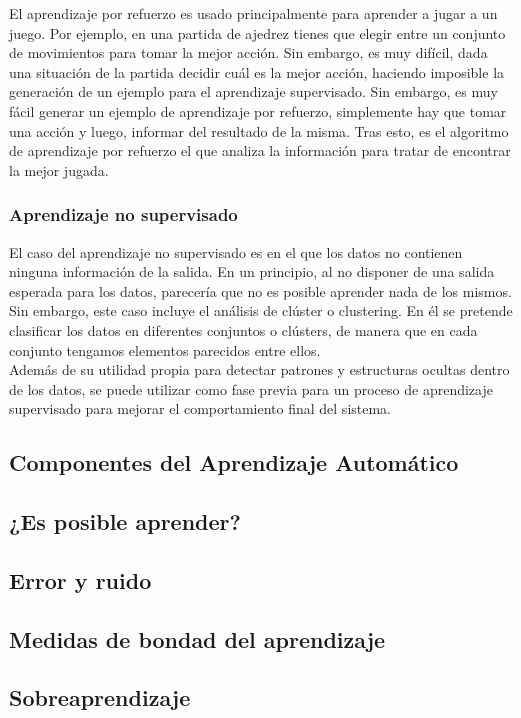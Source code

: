 El aprendizaje por refuerzo es usado principalmente para aprender a jugar a un juego. Por ejemplo, en una partida de ajedrez tienes que elegir entre un conjunto de movimientos para tomar la mejor acción. Sin embargo, es muy difícil, dada una situación de la partida decidir cuál es la mejor acción, haciendo imposible la generación de un ejemplo para el aprendizaje supervisado. Sin embargo, es muy fácil generar un ejemplo de aprendizaje por refuerzo, simplemente hay que tomar una acción y luego, informar del resultado de la misma. Tras esto, es el algoritmo de aprendizaje por refuerzo el que analiza la información para tratar de encontrar la mejor jugada.\\

\subsubsection{Aprendizaje no supervisado}

El caso del aprendizaje no supervisado es en el que los datos no contienen ninguna información de la salida. En un principio, al no disponer de una salida esperada para los datos, parecería que no es posible aprender nada de los mismos. Sin embargo, este caso incluye el análisis de clúster o clustering. En él se pretende clasificar los datos en diferentes conjuntos o clústers, de manera que en cada conjunto tengamos elementos parecidos entre ellos.\\

Además de su utilidad propia para detectar patrones y estructuras ocultas dentro de los datos, se puede utilizar como fase previa para un proceso de aprendizaje supervisado  para mejorar el comportamiento final del sistema.\\

\subsection{Componentes del Aprendizaje Automático}
\subsection{¿Es posible aprender?}
\subsection{Error y ruido}
\subsection{Medidas de bondad del aprendizaje}
\subsection{Sobreaprendizaje}